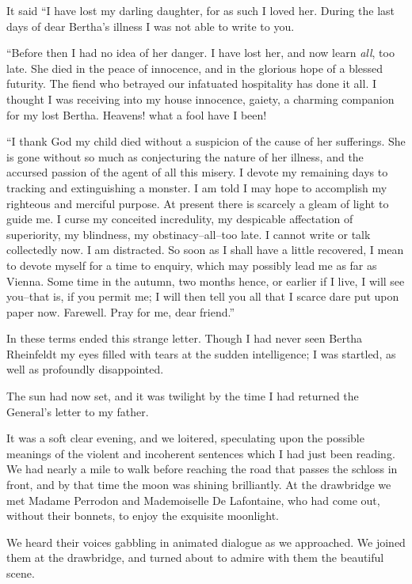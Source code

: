 \documentclass[11pt,twoside,makeidx,hidelinks,]{memoir}
\begin{document}
It said ``I have lost my darling daughter, for as such I loved her.
During the last days of dear Bertha's illness I was not able to write
to you.

``Before then I had no idea of her danger. I have lost her, and now learn
\emph{all}, too late. She died in the peace of innocence, and in the glorious
hope of a blessed futurity. The fiend who betrayed our infatuated
hospitality has done it all. I thought I was receiving into my house
innocence, gaiety, a charming companion for my lost Bertha. Heavens!
what a fool have I been!

``I thank God my child died without a suspicion of the cause of her
sufferings. She is gone without so much as conjecturing the nature of
her illness, and the accursed passion of the agent of all this misery. I
devote my remaining days to tracking and extinguishing a monster. I am
told I may hope to accomplish my righteous and merciful purpose. At
present there is scarcely a gleam of light to guide me. I curse my
conceited incredulity, my despicable affectation of superiority, my
blindness, my obstinacy--all--too late. I cannot write or talk
collectedly now. I am distracted. So soon as I shall have a little
recovered, I mean to devote myself for a time to enquiry, which may
possibly lead me as far as Vienna. Some time in the autumn, two months
hence, or earlier if I live, I will see you--that is, if you permit me;
I will then tell you all that I scarce dare put upon paper now.
Farewell. Pray for me, dear friend.''

In these terms ended this strange letter. Though I had never seen Bertha
Rheinfeldt my eyes filled with tears at the sudden intelligence; I was
startled, as well as profoundly disappointed.

The sun had now set, and it was twilight by the time I had returned the
General's letter to my father.

It was a soft clear evening, and we loitered, speculating upon the
possible meanings of the violent and incoherent sentences which I had
just been reading. We had nearly a mile to walk before reaching the road
that passes the schloss in front, and by that time the moon was shining
brilliantly. At the drawbridge we met Madame Perrodon and Mademoiselle
De Lafontaine, who had come out, without their bonnets, to enjoy the
exquisite moonlight.

We heard their voices gabbling in animated dialogue as we approached. We
joined them at the drawbridge, and turned about to admire with them the
beautiful scene.
\end{document}
